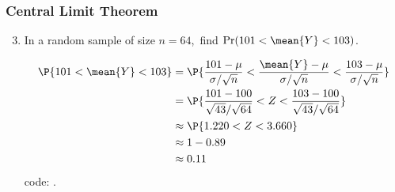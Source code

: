 \begin{frame}
\frametitle{Central Limit Theorem}
\ask
\begin{enumerate}\setcounter{enumi}{2}

\item In a random sample of size $n=64$,\, find $\text{Pr}(101<\mean{Y}<103)$.

\begin{answer}
\begin{align*}
\P{101 < \mean{Y} < 103}
  & = \P{\frac{101-\mu}{\sigma/\sqrt{n}} < \frac{\mean{Y}-\mu}{\sigma/\sqrt{n}} < \frac{103-\mu}{\sigma/\sqrt{n}}} \\
  & = \P{\frac{101-100}{\sqrt{43}/\sqrt{64}} < Z < \frac{103-100}{\sqrt{43}/\sqrt{64}}} \\  
  & \approx \P{1.220 < Z < 3.660} \\  
  & \approx 1 - 0.89\\
  & \approx 0.11
\end{align*}
\Rlang code: .
\end{answer}

\end{enumerate}
\end{frame}


